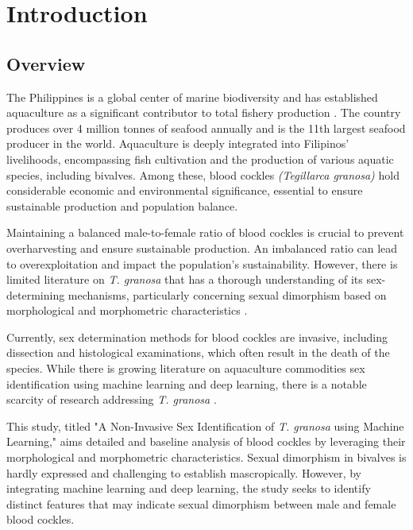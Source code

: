 \chapter{Introduction}
\label{sec:researchdesc}    %

\section{Overview}
\label{sec:overview}

The Philippines is a global center of marine biodiversity and has established aquaculture as a significant contributor to total fishery production \cite{aypa2000, bfar2019}. The country produces over 4 million tonnes of seafood annually and is the 11th largest seafood producer in the world. Aquaculture is deeply integrated into Filipinos' livelihoods, encompassing fish cultivation and the production of various aquatic species, including bivalves. Among these, blood cockles \textit{(Tegillarca granosa)} hold considerable economic and environmental significance, essential to ensure sustainable production and population balance.

Maintaining a balanced male-to-female ratio of blood cockles is crucial to prevent overharvesting and ensure sustainable production. An imbalanced ratio can lead to overexploitation and impact the population's sustainability. However, there is limited literature on \textit{T. granosa} that has a thorough understanding of its sex-determining mechanisms, particularly concerning sexual dimorphism based on morphological and morphometric characteristics \cite{breton2017sex}.

Currently, sex determination methods for blood cockles are invasive, including dissection and histological examinations, which often result in the death of the species. While there is growing literature on aquaculture commodities sex identification using machine learning and deep learning, there is a notable scarcity of research addressing \textit{T. granosa} \cite{miranda2023}.

This study, titled "A Non-Invasive Sex Identification of \textit{T. granosa} using Machine Learning," aims detailed and baseline analysis of blood cockles by leveraging their morphological and morphometric characteristics. Sexual dimorphism in bivalves is hardly expressed and challenging to establish mascropically\cite{karapunar2021}. However, by integrating machine learning and deep learning, the study seeks to identify distinct features that may indicate sexual dimorphism between male and female blood cockles.

